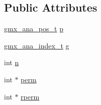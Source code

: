 \subsection*{\-Public \-Attributes}
\begin{DoxyCompactItemize}
\item 
\hyperlink{structgmx__ana__pos__t}{gmx\-\_\-ana\-\_\-pos\-\_\-t} \hyperlink{structt__methoddata__permute_a624b396a8a80e4058f2deca10a45975d}{p}
\item 
\hyperlink{structgmx__ana__index__t}{gmx\-\_\-ana\-\_\-index\-\_\-t} \hyperlink{structt__methoddata__permute_aeba736ef4f24f7d8ef19fa21f26896df}{g}
\item 
int \hyperlink{structt__methoddata__permute_a7e83f587742bc6bd355eda1f2629afb1}{n}
\item 
int $\ast$ \hyperlink{structt__methoddata__permute_ab283a79dfc6bc97da65ba402da12fd88}{perm}
\item 
int $\ast$ \hyperlink{structt__methoddata__permute_a061b45cffc8dc049e853385123db22e8}{rperm}
\end{DoxyCompactItemize}


